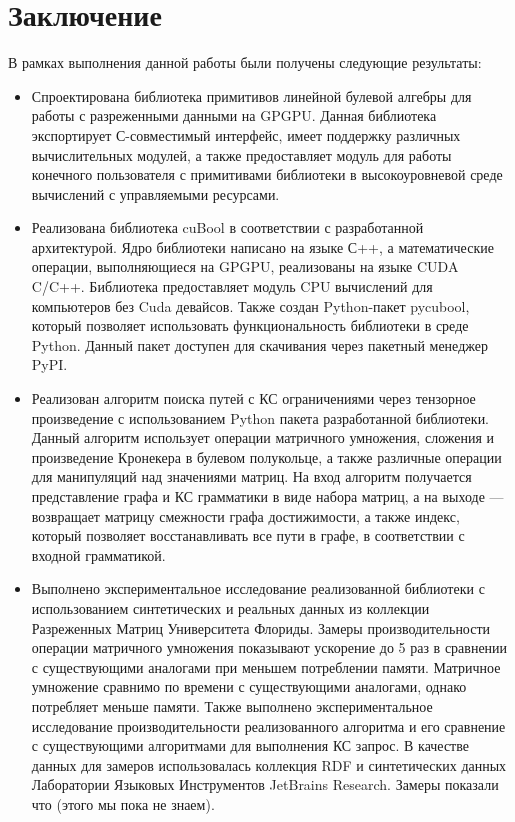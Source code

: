 \section{Заключение}

В рамках выполнения данной работы были получены следующие результаты:

\begin{itemize}
    \item Спроектирована библиотека примитивов линейной булевой алгебры для работы с разреженными данными на GPGPU. Данная библиотека экспортирует С-совместимый интерфейс, имеет поддержку различных вычислительных модулей, а также предоставляет модуль для работы конечного пользователя с примитивами библиотеки в высокоуровневой среде вычислений с управляемыми ресурсами.

    \item Реализована библиотека cuBool в соответствии с разработанной архитектурой. Ядро библиотеки написано на языке С++, а математические операции, выполняющиеся на GPGPU, реализованы на языке CUDA C/C++. Библиотека предоставляет модуль CPU вычислений для компьютеров без Cuda девайсов. Также создан Python-пакет pycubool, который позволяет использовать функциональность библиотеки в среде Python. Данный пакет доступен для скачивания через пакетный менеджер PyPI.
    
    \item Реализован алгоритм поиска путей с КС ограничениями через тензорное произведение с использованием Python пакета разработанной библиотеки. Данный алгоритм использует операции матричного умножения, сложения и произведение Кронекера в булевом полукольце, а также различные операции для манипуляций над значениями матриц. На вход алгоритм получается представление графа и КС грамматики в виде набора матриц, а на выходе --- возвращает матрицу смежности графа достижимости, а также индекс, который позволяет восстанавливать все пути в графе, в соответствии с входной грамматикой.
    
    \item Выполнено экспериментальное исследование реализованной библиотеки с использованием синтетических и реальных данных из коллекции Разреженных Матриц Университета Флориды. Замеры производительности операции матричного умножения показывают ускорение до 5 раз в сравнении с существующими аналогами при меньшем потреблении памяти. Матричное умножение сравнимо по времени с существующими аналогами, однако потребляет меньше памяти. Также выполнено экспериментальное исследование производительности реализованного алгоритма и его сравнение с существующими алгоритмами для выполнения КС запрос. В качестве данных для замеров использовалась коллекция RDF и синтетических данных Лаборатории Языковых Инструментов JetBrains Research. Замеры показали что (этого мы пока не знаем).
\end{itemize}


